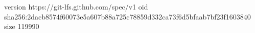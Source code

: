 version https://git-lfs.github.com/spec/v1
oid sha256:2dacb8574f60073e5a607b88a725c78859d332ca73f6d5bfaab7bf23f1603840
size 119990
